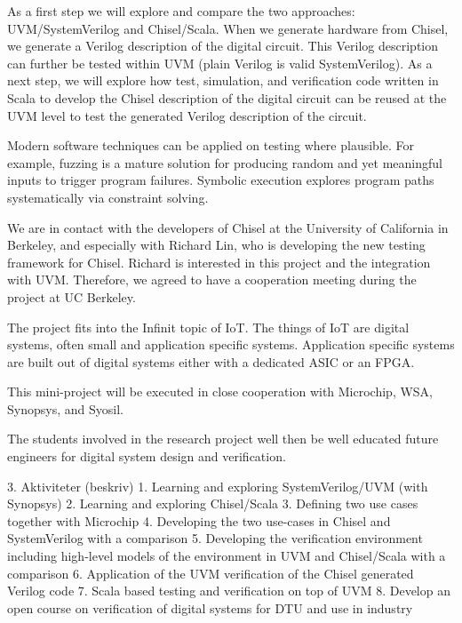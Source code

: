\documentclass[fleqn,12pt]{article}
\begin{document}
As a first step we will explore and compare the two approaches: UVM/SystemVerilog and Chisel/Scala. When we generate hardware from Chisel, we generate a Verilog description of the digital circuit. This Verilog description can further be tested within UVM (plain Verilog is valid SystemVerilog). As a next step, we will explore how test, simulation, and verification code written in Scala to develop the Chisel description of the digital circuit can be reused at the UVM level to test the generated Verilog description of the circuit.


Modern software techniques can be applied on testing where plausible. For example, fuzzing is a mature solution for producing random and yet meaningful inputs to trigger program failures. Symbolic execution explores program paths systematically via constraint solving.



We are in contact with the developers of Chisel at the University of California in Berkeley, and especially with Richard Lin, who is developing the new testing framework for Chisel. Richard is interested in this project and the integration with UVM. Therefore, we agreed to have a cooperation meeting during the project at UC Berkeley.



The project fits into the Infinit topic of IoT. The things of IoT are digital systems, often small and application specific systems. Application specific systems are built out of digital systems either with a dedicated ASIC or an FPGA.



This mini-project will be executed in close cooperation with Microchip, WSA, Synopsys, and Syosil. 



The students involved in the research project well then be well educated future engineers for digital system design and verification.



3. Aktiviteter (beskriv) 1. Learning and exploring SystemVerilog/UVM (with Synopsys)
2. Learning and exploring Chisel/Scala
3. Defining two use cases together with Microchip
4. Developing the two use-cases in Chisel and SystemVerilog with a comparison
5. Developing the verification environment including high-level models of the environment in UVM and Chisel/Scala with a comparison
6. Application of the UVM verification of the Chisel generated Verilog code
7. Scala based testing and verification on top of UVM
8. Develop an open course on verification of digital systems for DTU and use in industry
\end{document}
